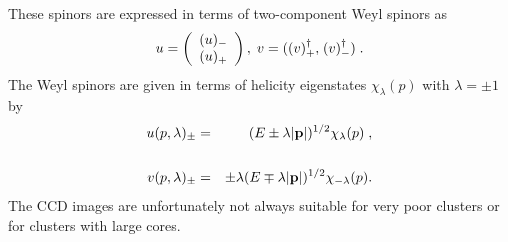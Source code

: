 \begin{article}
These spinors are expressed in terms 
of two-component Weyl spinors as 
\begin{equation}
   u=\left(\begin{array}{c}(u)_-\\(u)
   _+\end{array}\right),\;v={\bf (}(v)^\dagger_+{\bf ,} 
   \; (v)^\dagger_-{\bf )}\;.
\end{equation}
The Weyl spinors are given in terms of helicity 
eigen\-states $\chi_\lambda(p)$ with $\lambda=\pm1$ 
by
\begin{eqnarray}u(p, \lambda)_\pm & = & 
   (E\pm\lambda|{\bf p}|)^{1/2}\chi_\lambda(p)\;, 
   \nonumber \\ & & \\v(p,\lambda)_\pm & = & 
   \pm\lambda(E\mp\lambda|{\bf 
   p}|)^{1/2}\chi_{-\lambda}(p). \nonumber
\end{eqnarray}
The CCD images are unfortunately not always suitable 
for very poor clusters or for clusters with large cores.



\end{article}
